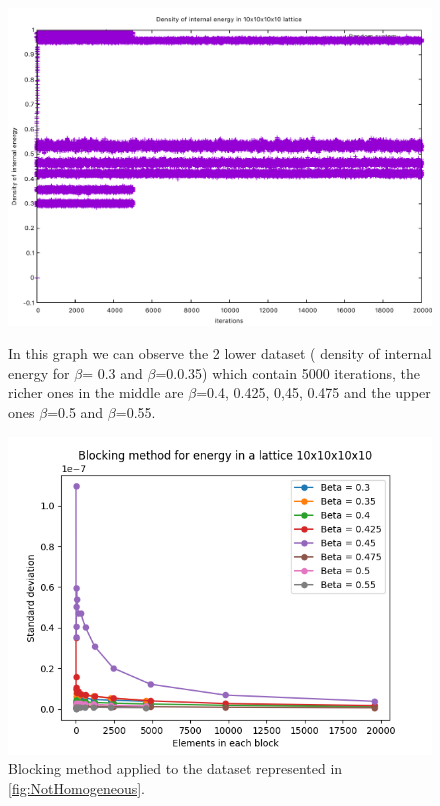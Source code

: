             \begin{figure}[H]
                \centering
                \includegraphics[scale= 0.40]{ThermalizationNotHomogeneous.pdf}
                \caption{In this graph we can observe the 2 lower dataset ( density of internal energy for $\beta$= 0.3 and $\beta$=0.0.35) 
                which contain 5000 iterations, the richer ones in the middle are $\beta$={0.4, 0.425, 0,45, 0.475} and the upper ones $\beta$=0.5 and $\beta$=0.55.}
                \label{fig:NotHomogeneous} 
                \includegraphics[scale= 0.40]{CorrectBlocking2.png} 
                \caption{Blocking method applied to the dataset represented in \cref{fig:NotHomogeneous}.}
                \label{fig:CorrectBlocking2} 
            \end{figure}
    